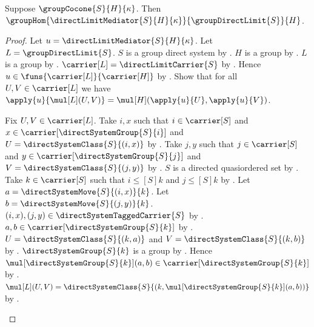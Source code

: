 \begin{theorem}\label{direct_limit_mediator_hom}
    Suppose $\groupCocone{S}{H}{\kappa}$.
    Then $\groupHom
        {\directLimitMediator{S}{H}{\kappa}}
        {\groupDirectLimit{S}}{H}$.
\end{theorem}
\begin{proof}
    Let $u=\directLimitMediator{S}{H}{\kappa}$.
    Let $L=\groupDirectLimit{S}$.
    $S$ is a group direct system by
        .
    $H$ is a group by .
    $L$ is a group by .
    $\carrier[L]=\directLimitCarrier{S}$ by
        .
    Hence $u\in\funs{\carrier[L]}{\carrier[H]}$ by
        .
    Show that for all $U,V\in\carrier[L]$ we have
        $\apply{u}{\mul[L](U,V)}=
        \mul[H](\apply{u}{U},\apply{u}{V})$.
    \begin{subproof}
        Fix $U,V\in\carrier[L]$.
        Take $i,x$ such that $i\in\carrier[S]$ and
            $x\in\carrier[\directSystemGroup{S}{i}]$ and
            $U=\directSystemClass{S}{(i,x)}$ by
            .
        Take $j,y$ such that $j\in\carrier[S]$ and
            $y\in\carrier[\directSystemGroup{S}{j}]$ and
            $V=\directSystemClass{S}{(j,y)}$ by
            .
        $S$ is a directed quasiordered set by
            .
        Take $k\in\carrier[S]$ such that
            $i\mathrel{\leq[S]}k$ and $j\mathrel{\leq[S]}k$ by
            .
        Let $a=\directSystemMove{S}{(i,x)}{k}$.
        Let $b=\directSystemMove{S}{(j,y)}{k}$.
        $(i,x),(j,y)\in\directSystemTaggedCarrier{S}$ by
            .
        $a,b\in\carrier[\directSystemGroup{S}{k}]$ by
            .
        $U=\directSystemClass{S}{(k,a)}$ and
            $V=\directSystemClass{S}{(k,b)}$ by
            .
        $\directSystemGroup{S}{k}$ is a group by
            .
        Hence $\mul[\directSystemGroup{S}{k}](a,b)\in
            \carrier[\directSystemGroup{S}{k}]$ by
            .
        $\mul[L](U,V)=\directSystemClass{S}
            {(k,\mul[\directSystemGroup{S}{k}](a,b))}$ by
            .

\end{subproof}
\end{proof}
